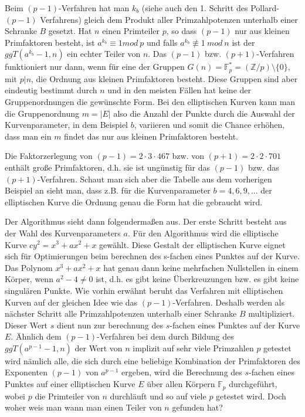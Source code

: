 \documentclass[a4paper,11pt]{article}
\begin{document}
Beim $(p-1)$-Verfahren hat man $k_b$ (siehe
auch den 1. Schritt des Pollard-$(p-1)$ Verfahrens) gleich dem Produkt aller
Primzahlpotenzen unterhalb einer Schranke $B$ gesetzt. Hat $n$ einen Primteiler 
$p$, so dass $(p-1)$ nur aus kleinen Primfaktoren besteht, ist
$a^{k_b} \equiv 1 mod\ p$ und falls  $a^{k_b}\not\equiv 1\ mod\ n $ ist der 
$ggT(a^{k_b}-1,n)$ ein echter Teiler von $n$. 
Das $(p-1)$ bzw. $(p+1)$-Verfahren funktioniert nur dann, wenn für eine der 
Gruppen $G(n) = \mathbb F_p^* = (\mathbb Z/p)\setminus\{0\}$, mit $p|n$, die
Ordnung aus
kleinen Primfaktoren besteht. Diese Gruppen sind aber eindeutig bestimmt durch 
$n$ und in den meisten Fällen hat keine der Gruppenordnungen die gewünschte 
Form. Bei den elliptischen Kurven kann man die Gruppenordnung $m=|E|$ also die
Anzahl der Punkte durch die Auswahl der Kurvenparameter, in dem Beispiel $b$, 
variieren und somit die Chance erhöhen, dass man ein $m$ findet das nur aus 
kleinen Primfaktoren besteht. 

Die Faktorzerlegung von $(p-1) = 2\cdot3\cdot467$ bzw. von
$(p+1) = 2\cdot2\cdot701$ enthält große Primfaktoren, d.h. sie ist ungünstig für
das $(p-1)$ bzw. das $(p+1)$-Verfahren. Schaut man sich aber die Tabelle aus 
dem vorherigen Beispiel an sieht man, dass z.B. für die Kurvenparameter 
$b=4,6,9, ...$ der elliptischen Kurve die Ordnung genau die Form hat die 
gebraucht wird.

Der Algorithmus sieht dann folgendermaßen aus. Der erste Schritt besteht aus 
der Wahl des Kurvenparameters $a$. Für den Algorithmus wird die 
elliptische Kurve $cy^2 = x^3 + ax^2 +x$ gewählt. Diese Gestalt der 
elliptischen Kurve eignet sich für Optimierungen beim berechnen des s-fachen
eines Punktes auf der Kurve. Das Polynom $x^3+ax^2+x$ hat genau dann keine
mehrfachen Nullstellen in einem Körper, wenn $a^2-4\neq 0$ ist, d.h. es gibt
keine Überkreuzungen bzw. es gibt keine singulären Punkte. 
Wie vorhin erwähnt beruht das Verfahren mit elliptischen Kurven auf der gleichen
Idee wie das  $(p-1)$-Verfahren. Deshalb werden als nächster Schritt alle
Primzahlpotenzen unterhalb einer Schranke $B$
multipliziert. Dieser Wert $s$
dient nun zur berechnung des $s$-fachen eines Punktes auf der Kurve
$E$. Ähnlich dem $(p-1)$-Verfahren bei dem durch Bildung des 
$ggT(a^{p-1}-1,n)$ der Wert von $n$ implizit auf sehr viele Primzahlen $p$
getestet wird nämlich alle, die sich durch eine beliebige Kombination der 
Primfaktoren des Exponenten $(p-1)$ von $a^{p-1}$ ergeben, wird die Berechnung
des $s$-fachen eines Punktes auf einer elliptischen Kurve $E$ über allen 
Körpern $\mathbb F_p$ durchgeführt, wobei $p$ die Primteiler von $n$ durchläuft
und so auf viele $p$ getestet wird. Doch woher weis man wann man einen Teiler 
 von $n$ gefunden hat? 
\end{document}
